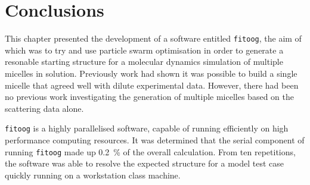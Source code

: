 \section{Conclusions}
This chapter presented the development of a software entitled \texttt{fitoog}, the aim of which was to try and use particle swarm optimisation in order to generate a resonable starting structure for a molecular dynamics simulation of multiple micelles in solution.
Previously work had shown it was possible to build a single micelle that agreed well with dilute experimental data.
However, there had been no previous work investigating the generation of multiple micelles based on the scattering data alone.

\texttt{fitoog} is a highly parallelised software, capable of running efficiently on high performance computing resources.
It was determined that the serial component of running \texttt{fitoog} made up \SI{0.2}{\percent} of the overall calculation.
From ten repetitions, the software was able to resolve the expected structure for a model test case quickly running on a workstation class machine.
